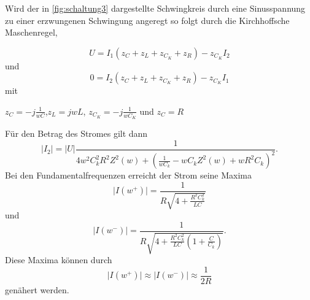 Wird der in \autoref{fig:schaltung3} dargestellte Schwingkreis durch eine Sinusspannung zu einer erzwungenen Schwingung angeregt
so folgt durch die Kirchhoffsche Maschenregel,






\begin{equation}
    U = I_1 (z_C + z_L + z_{C_K} + z_R) - z_{C_K} I_2
    \label{eqn:Fuenfzehn}
\end{equation}
und
\begin{equation}
    0 = I_2 (z_C + z_L + z_{C_K} + z_R) - z_{C_K} I_1
    \label{eqn:Sechzehn}
\end{equation}
mit
\begin{center}
    $z_C = -j \frac{1}{wC}$,$z_L = jwL$, $z_{C_K} = -j \frac{1}{wC_K}$  und  $z_C = R$
\end{center}
Für den Betrag des Stromes gilt dann
\begin{equation}
    \lvert I_2\rvert = \lvert U\rvert \frac{1}{ 4w^2C_k^2R^2Z^2(w) + ( \frac{1}{wC_k} - wC_kZ^2(w) + wR^2C_k )^2 }.
    \label{eqn:Zwanzig}
\end{equation}
Bei den Fundamentalfrequenzen erreicht der Strom seine Maxima
\begin{equation}
    \lvert I(w^{+})\rvert = \frac{1}{ R\sqrt{4 + \frac{R^2C_k^2}{LC}}}
    \label{eqn:Einundzwandzig}
\end{equation}
und
\begin{equation}
    \lvert I(w^{-})\rvert = \frac{1}{ R\sqrt{4 + \frac{R^2C_k^2}{LC}(1+\frac{C}{C_k})}}.
    \label{eqn:Zweiundzwandzig}
\end{equation}
Diese Maxima können durch 
\begin{equation}
    \lvert I(w^{+})\rvert \approx \lvert I(w^{-})\rvert \approx \frac{1}{2R}
    \label{eqn:Dreiundzwandzig}
\end{equation}
genähert werden.


